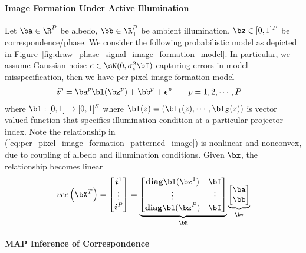 \documentclass[../writeup.tex]{subfiles}
\begin{document}
\paragraph{Image Formation Under Active Illumination}

Let $\ba \in \R_+^{P}$ be albedo, $\bb\in\R_+^P$ be ambient illumination, $\bz\in[0,1]^{P}$ be correspondence/phase. We consider the following probabilistic model as depicted in Figure~\ref{fig:draw_phase_signal_image_formation_model}. In particular, we assume Gaussian noise $\bepsilon\in\sN(0,\sigma^2_{\epsilon}\bI)$ capturing errors in model misspecification, then we have per-pixel image formation model
\begin{align}
    \si^p
        &= \ba^p \bl(\bz^p) + \bb^p + \bepsilon^p
        \qquad
        p = 1,2,\cdots,P
    \label{eq:per_pixel_image_formation_patterned_image}
\end{align}
where $\bl:[0,1]\to [0,1]^S$ where $\bl(z) = (\bl_1(z),\cdots,\bl_S(z))$ is vector valued function that specifies illumination condition at a particular projector index. Note the relationship in (\ref{eq:per_pixel_image_formation_patterned_image}) is nonlinear and nonconvex, due to coupling of albedo and illumination conditions. Given $\bz$, the relationship becomes linear
\begin{align}
    \vec{\bX^T}
        =
    \begin{bmatrix}
        \si^1 \\
        \vdots \\
        \si^P \\
    \end{bmatrix}
        =
            \underbrace{
                \begin{bmatrix}
                    \diag \bl(\bz^1) & \bI \\ 
                    \vdots & \vdots \\ 
                    \diag \bl(\bz^P) & \bI \\
                \end{bmatrix}
            }_{\bM}
            \underbrace{
                \begin{bmatrix}
                    \ba \\ \bb 
                \end{bmatrix}
            }_{\bv}
    \label{eq:per_pixel_image_formation_patterned_image_given_correspondence}
\end{align}

\paragraph{MAP Inference of Correspondence}
\end{document}

